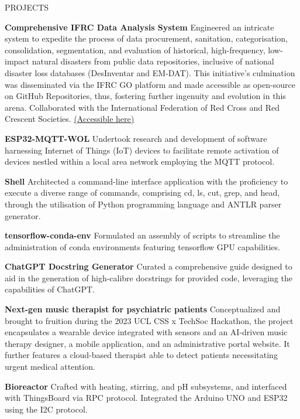 \documentclass{resume} %
\begin{document}
\begin{rSection}{PROJECTS}
    \vspace{-1.25em}
    \item \textbf{Comprehensive IFRC Data Analysis System} {Engineered an intricate system to expedite the process of data procurement, sanitation, categorisation, consolidation, segmentation, and evaluation of historical, high-frequency, low-impact natural disasters from public data repositories, inclusive of national disaster loss databases (DesInventar and EM-DAT). This initiative's culmination was disseminated via the IFRC GO platform and made accessible as open-source on GitHub Repositories, thus, fostering further ingenuity and evolution in this arena. Collaborated with the International Federation of Red Cross and Red Crescent Societies.
    \href{https://students.cs.ucl.ac.uk/2022/group5/index.html}{(Accessible here)}}
    \item \textbf{ESP32-MQTT-WOL} {Undertook research and development of software harnessing Internet of Things (IoT) devices to facilitate remote activation of devices nestled within a local area network employing the MQTT protocol.}
    \item \textbf{Shell} {Architected a command-line interface application with the proficiency to execute a diverse range of commands, comprising cd, ls, cut, grep, and head, through the utilisation of Python programming language and ANTLR parser generator.}
    \item \textbf{tensorflow-conda-env} {Formulated an assembly of scripts to streamline the administration of conda environments featuring tensorflow GPU capabilities.}
    \item \textbf{ChatGPT Docstring Generator} {Curated a comprehensive guide designed to aid in the generation of high-calibre docstrings for provided code, leveraging the capabilities of ChatGPT.}
    \item \textbf{Next-gen music therapist for psychiatric patients} {Conceptualized and brought to fruition during the 2023 UCL CSS x TechSoc Hackathon, the project encapsulates a wearable device integrated with sensors and an AI-driven music therapy designer, a mobile application, and an administrative portal website. It further features a cloud-based therapist able to detect patients necessitating urgent medical attention.}
    \item \textbf{Bioreactor} {Crafted with heating, stirring, and pH subsystems, and interfaced with ThingsBoard via RPC protocol. Integrated the Arduino UNO and ESP32 using the I2C protocol.}
\end{rSection} 
\end{document}
